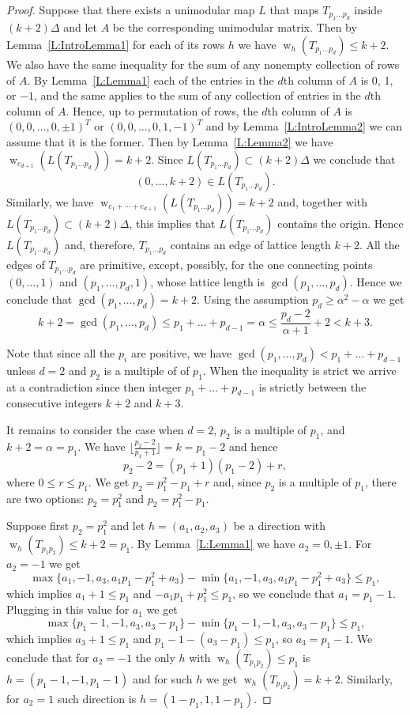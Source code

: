 \documentclass[11pt]{amsart}
\numberwithin{equation}{section}
\theoremstyle{plain}
\theoremstyle{definition}
\newcommand{\w}{\operatorname{w}}
\begin{document}
\begin{proof}
Suppose that there exists a unimodular map $L$ that maps $T_{p_1\dots p_d}$ inside $(k+2)\Delta$ and let $A$ be the corresponding 
unimodular matrix. Then by Lemma~\ref{L:IntroLemma1} for each of its rows  $h$ we have $\w_{h}(T_{p_1\dots p_d})\leq k+2$. We also have the same 
inequality for the sum of any nonempty collection of rows of $A$. By Lemma~\ref{L:Lemma1} each of the entries in the $d$th column of $A$
is 0, 1, or $-1$, and the same applies to the sum of any collection of entries in the  $d$th column of $A$. Hence, up to permutation of rows, the $d$th column
of $A$ is $(0,0,\dots, 0,\pm 1)^T$ or $(0,0,\dots, 0,1, -1)^T$ and by Lemma~\ref{L:IntroLemma2} we can assume that it is the former. Then by Lemma~\ref{L:Lemma2} we have $\w_{e_{d+1}}(L(T_{p_1\dots p_d}))=k+2$.
Since $L(T_{p_1\dots p_d})\subset (k+2)\Delta$ we conclude that 
$$(0,\dots, k+2)\in L(T_{p_1\dots p_d}).$$ 
Similarly, we have $\w_{e_1+\cdots+e_{d+1}}(L(T_{p_1\dots p_d}))=k+2$ and, together 
with $L(T_{p_1\dots p_d})\subset (k+2)\Delta$, this implies that $L(T_{p_1\dots p_d})$ contains the origin. Hence $L(T_{p_1\dots p_d})$ and, therefore, $T_{p_1\dots p_d}$ contains an edge of lattice length 
$k+2$. All the edges of $T_{p_1\dots p_d}$ are primitive, except, possibly, for the one connecting points $(0,\dots,1)$ and $(p_1,\dots,p_d,1)$, whose lattice length is $\gcd(p_1,\dots,p_d)$.
Hence we conclude that $\gcd(p_1,\dots,p_d)=k+2$.   Using the assumption $p_d\geq \alpha^2-\alpha$ we get
$$k+2=\gcd(p_1,\dots, p_d)\leq p_1+\dots+p_{d-1}=\alpha\leq \frac{p_d-2}{\alpha+1}+2<k+3.
$$

Note that since all the $p_i$ are positive, we have $\gcd(p_1,\dots, p_d)< p_1+\dots+p_{d-1}$ unless $d=2$ and $p_2$ is a multiple of of $p_1$.
When the inequality is strict we arrive  at a contradiction since then integer $p_1+\dots+p_{d-1}$ is strictly between the consecutive integers $k+2$ and $k+3$.

It remains to consider the case when $d=2$, $p_2$ is a multiple of $p_1$, and $k+2=\alpha=p_1$.  
We have $\lfloor\frac{p_2-2}{p_1+1}\rfloor=k=p_1-2$ and hence
$$p_2-2=(p_1+1)(p_1-2)+r,
$$
where $0\leq r\leq p_1$. We get  $p_2=p_1^2-p_1+r$ and, since $p_2$ is a multiple of $p_1$, there are two options: $p_2=p_1^2$ and $p_2=p_1^2-p_1$.

Suppose first $p_2=p_1^2$ and let $h=(a_1, a_2,a_3)$ be a direction with $\w_h(T_{p_1p_2})\leq k+2=p_1$.
By Lemma~\ref{L:Lemma1} we have $a_2=0,\pm 1$.  For  $a_2=-1$ we get
$$\max\{a_1,-1,a_3,a_1p_1-p_1^2+a_3\}-\min\{a_1,-1,a_3,a_1p_1-p_1^2+a_3\}\le p_1,
$$
which implies $a_1+1\leq p_1$ and $-a_1p_1+p_1^2\leq p_1$, so we conclude that $a_1=p_1-1$. Plugging in this value for $a_1$ we get
$$\max\{p_1-1,-1,a_3,a_3-p_1\}-\min\{p_1-1,-1,a_3,a_3-p_1\}\le p_1,
$$
which implies $a_3+1\leq p_1$ and $p_1-1-(a_3-p_1)\leq p_1$, so $a_3=p_1-1$. We conclude that for $a_2=-1$ the only $h$ with $\w_h(T_{p_1p_2})\leq p_1$ is 
$h=(p_1-1,-1,p_1-1)$ and for such $h$ we get $\w_h(T_{p_1p_2})=k+2$. Similarly, for $a_2=1$ such direction is $h=(1-p_1,1,1-p_1)$.




\end{proof}
\end{document}

